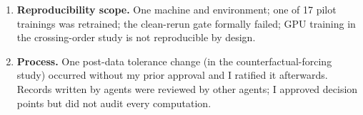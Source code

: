 \documentclass[11pt,a4paper]{article}
\DeclareRobustCommand{\_}{\ifmmode\origunderscore\else\textunderscore\allowbreak\fi}
\begin{document}
\begin{enumerate}
the pilot world (the full test therefore moved to a world where it does not); the untrained-chart
control of the full test was unavailable for two of its three models (and for five of six in the
worlds study); the P control is one-sided;
the learning-speed kernel is confounded with speed.
\item \textbf{Reproducibility scope.} One machine and environment; one of 17 pilot trainings was
retrained; the clean-rerun gate formally failed; GPU training in the crossing-order study is not
reproducible by design.
\item \textbf{Process.} One post-data tolerance change (in the counterfactual-forcing study)
occurred without my prior approval and I
ratified it afterwards. Records written by agents were reviewed by other agents; I approved decision
points but did not audit every computation.
\end{enumerate}

\end{document}
